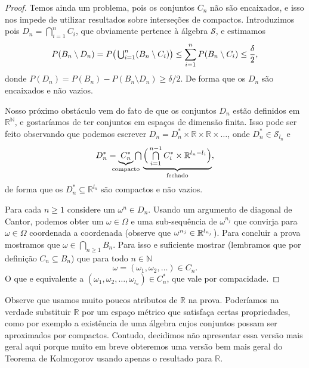 \begin{proof}
  Temos ainda um problema, pois os conjuntos $C_n$ não são encaixados, e isso nos impede de utilizar resultados sobre interseções de compactos.
  Introduzimos pois $D_n = \bigcap_{i=1}^n C_i$, que obviamente pertence à álgebra $\mathcal{S}$, e estimamos
  \begin{equation}
    P(B_n \setminus D_n) = P \big( \operatorname*{{\textstyle \bigcup}}\nolimits_{i=1}^n (B_n \setminus C_i) \big) \leq \sum_{i=1}^n P(B_n \setminus C_i) \leq \frac{\delta}2,
  \end{equation}
  donde $P(D_n) = P(B_n) - P(B_n \setminus D_n) \geq \delta/2$.
  De forma que os $D_n$ são encaixados e não vazios.

  Nosso próximo obstáculo vem do fato de que os conjuntos $D_n$ estão definidos em $\mathbb{R}^\mathbb{N}$, e gostaríamos de ter conjuntos em espaços de dimensão finita.
  Isso pode ser feito observando que podemos escrever $D_n = D_n^* \times \mathbb{R} \times \mathbb{R} \times \dots$, onde $D_n^* \in \mathcal{S}_{l_n}$ e
  \begin{equation}
    D_n^* = \underbrace{C_n^*}_{\mathclap{\text{compacto}}} \mcap \underbrace{ \Big( \mcap_{i=1}^{n-1} C_i^* \times \mathbb{R}^{l_n - l_i} \Big)}_{\text{fechado}},
  \end{equation}
  de forma que os $D_n^* \subseteq \mathbb{R}^{l_n}$ são compactos  e não vazios.

  Para cada $n \geq 1$ considere um $\omega^n \in D_n$.
  Usando um argumento de diagonal de Cantor, podemos obter um $\omega \in \Omega$
  e uma sub-sequência de $\omega^{n_j}$ que convirja para $\omega \in \Omega$ coordenada a coordenada
  (observe que $\omega^{n_j} \in \mathbb{R}^{\smash{l_{n_j}}}$).  %
 Para concluir a prova mostramos que $\omega \in \bigcap_{n\ge 1} B_n$.
 Para isso e suficiente mostrar (lembramos que por definição $C_n \subseteq B_n$) que para todo $n\in \mathbb{N}$
  \begin{equation*}
\omega = (\omega_1, \omega_2, \dots) \in C_n.
  \end{equation*}
  O que e equivalente a $(\omega_1, \omega_2, \dots, \omega_{l_n}) \in C^*_n$, que vale por compacidade.
\end{proof}

Observe que usamos muito poucos atributos de $\mathbb{R}$ na prova.
Poderíamos na verdade substituir $\mathbb{R}$ por um espaço métrico que satisfaça certas propriedades, como por exemplo a existência de uma álgebra cujos conjuntos possam ser aproximados por compactos.
Contudo, decidimos não apresentar essa versão mais geral aqui porque muito em breve obteremos uma versão bem mais geral do Teorema de Kolmogorov usando apenas o resultado para $\mathbb{R}$.

